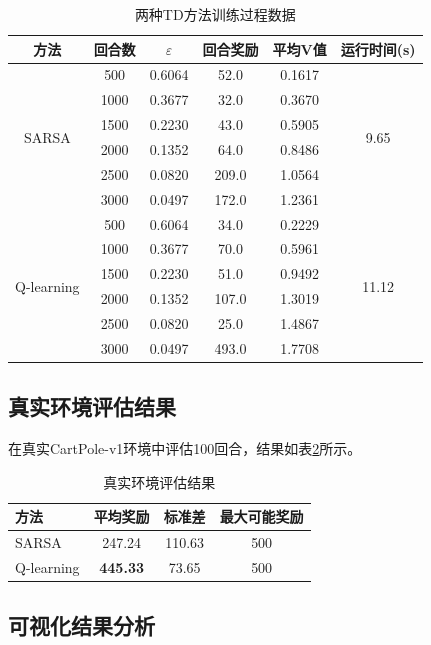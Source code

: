 \documentclass[12pt,a4paper]{article}
\begin{document}
\begin{table}[H]
\centering
\caption{两种TD方法训练过程数据}
\label{tab:training}
\begin{tabular}{cccccc}
\toprule
\textbf{方法} & \textbf{回合数} & \textbf{$\varepsilon$} & \textbf{回合奖励} & \textbf{平均V值} & \textbf{运行时间(s)} \\
\midrule
\multirow{6}{*}{SARSA} & 500 & 0.6064 & 52.0 & 0.1617 & \multirow{6}{*}{9.65} \\
 & 1000 & 0.3677 & 32.0 & 0.3670 & \\
 & 1500 & 0.2230 & 43.0 & 0.5905 & \\
 & 2000 & 0.1352 & 64.0 & 0.8486 & \\
 & 2500 & 0.0820 & 209.0 & 1.0564 & \\
 & 3000 & 0.0497 & 172.0 & 1.2361 & \\
\midrule
\multirow{6}{*}{Q-learning} & 500 & 0.6064 & 34.0 & 0.2229 & \multirow{6}{*}{11.12} \\
 & 1000 & 0.3677 & 70.0 & 0.5961 & \\
 & 1500 & 0.2230 & 51.0 & 0.9492 & \\
 & 2000 & 0.1352 & 107.0 & 1.3019 & \\
 & 2500 & 0.0820 & 25.0 & 1.4867 & \\
 & 3000 & 0.0497 & 493.0 & 1.7708 & \\
\bottomrule
\end{tabular}
\end{table}

\subsection{真实环境评估结果}

在真实CartPole-v1环境中评估100回合，结果如表\ref{tab:evaluation}所示。

\begin{table}[H]
\centering
\caption{真实环境评估结果}
\label{tab:evaluation}
\begin{tabular}{lccc}
\toprule
\textbf{方法} & \textbf{平均奖励} & \textbf{标准差} & \textbf{最大可能奖励} \\
\midrule
SARSA & 247.24 & 110.63 & 500 \\
Q-learning & \textbf{445.33} & 73.65 & 500 \\
\bottomrule
\end{tabular}
\end{table}

\subsection{可视化结果分析}
\end{document}
